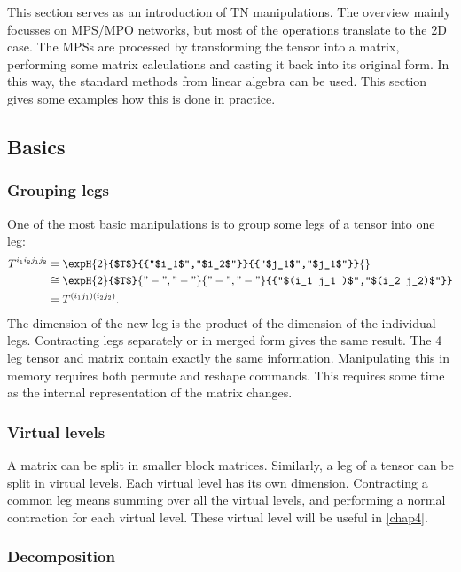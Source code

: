 This section serves as an introduction of \Gls{TN} manipulations. The overview mainly focusses on \Gls{MPS}/\Gls{MPO} networks, but most of the operations translate to the 2D case.
The \Glspl{MPS} are processed by transforming the tensor into a matrix, performing some matrix calculations and casting it back into its original form. In this way, the standard methods from linear algebra can be used. This section gives some examples how this is done in practice.

\subsection{Basics}

\subsubsection{Grouping legs}
One of the most basic manipulations is to group some legs of a tensor into one leg:
\begin{align}
    T^{i_1 i_2 j_1 j_2} & =  \expH{2}{$T$}{{"$i_1$","$i_2$"}}{{"$j_1$","$j_1$"}}{}  \nonumber                  \\
                        & \cong \expH{2}{$T$}{{"-","-"}}{{"-","-"}}{{"$(i_1 j_1 )$","$(i_2 j_2)$"}}  \nonumber \\
                        & = T^{ (i_1 j_1 ) (i_2 j_2) }        .
\end{align}
The dimension of the new leg is the product of the dimension of the individual legs. Contracting legs separately or in merged form gives the same result. The 4 leg tensor and matrix contain exactly the same information. Manipulating this in memory requires both permute and reshape commands. This requires some time as the internal representation of the matrix changes.

\subsubsection{Virtual levels}
A matrix can be split in smaller block matrices. Similarly, a leg of a tensor can be split in virtual levels. Each virtual level has its own dimension. Contracting a common leg means summing over all the virtual levels, and performing a normal contraction for each virtual level. These virtual level will be useful in \cref{chap4}.

\subsubsection{Decomposition} \label{decompMPO}
\def \figone {\expH{2}{$O^{u v,v w}$}{{"$i_1$","$i_2$"}}{{"$j_1$","$j_1$"}}{{"u","w"}}}

